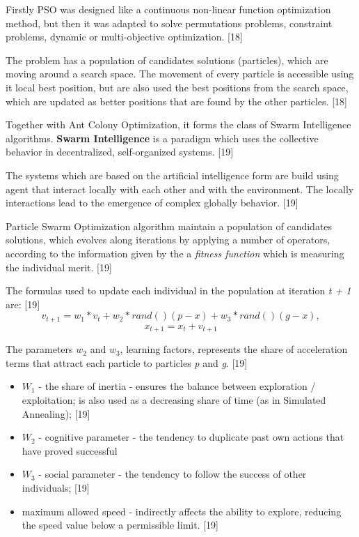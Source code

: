 Firstly PSO was designed like a continuous non-linear function optimization method, but then it was adapted to solve permutations problems, constraint problems, dynamic or multi-objective optimization. [18]

The problem has a population of candidates solutions \big(particles), which are moving around a search space. The movement of every particle is accessible using it local best position, but are also used the best positions from the search space, which are updated as better positions that are found by the other particles. [18]

Together with Ant Colony Optimization, it forms the class of Swarm Intelligence algorithms. \textbf{Swarm Intelligence} is a paradigm which uses the collective behavior in decentralized, self-organized systems. [19]

The systems which are based on the artificial intelligence form are build using agent that interact locally with each other and with the environment. The locally interactions lead to the emergence of complex globally behavior. [19]

Particle Swarm Optimization algorithm maintain a population of candidates solutions, which evolves along iterations by applying a number of operators, according to the information given by the a \textit{fitness function} which is measuring the individual merit. [19]

The formulas used to update each individual in the population at iteration \textit{t + 1} are: [19]
$$v_{t+1} = w_1 * v_t + w_2 * rand()(p - x) + w_3 * rand() (g - x),$$
$$x_{t+1} = x_t + v_{t+1}$$

The parameters $w_{2}$ and $w_{3}$, learning factors, represents the share of acceleration terms that attract each particle to particles \textit{p} and \textit{g}. [19]

\begin{itemize}
	\item $W_{1}$ - the share of inertia - ensures the balance between exploration / exploitation; is also used as a decreasing share of time \big(as in Simulated Annealing); [19]
	\item $W_{2}$ - cognitive parameter - the tendency to duplicate past own actions that have proved successful
	\item $W_{3}$ - social parameter - the tendency to follow the success of other individuals; [19]
	\item maximum allowed speed - indirectly affects the ability to explore, reducing the speed value below a permissible limit. [19]
\end{itemize}

